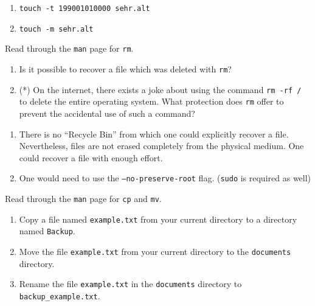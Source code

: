 \documentclass[english]{sheet}
\begin{document}
\begin{solution}
    \begin{enumerate}
        \item \texttt{touch -t 199001010000 sehr.alt}
        \item \texttt{touch -m sehr.alt}
    \end{enumerate}
\end{solution}

\begin{exercise}[subtitle=Deletions with \texttt{rm}]
    Read through the \texttt{man} page for \texttt{rm}.
    \begin{enumerate}
        \item Is it possible to recover a file which was deleted with \texttt{rm}?
        \item (*) On the internet, there exists a joke about using the command \texttt{rm -rf /} to delete the entire operating system. What protection does \texttt{rm} offer to prevent the accidental use of such a command?
    \end{enumerate}
\end{exercise}

\begin{solution}
    \begin{enumerate}
        \item There is no ``Recycle Bin'' from which one could explicitly recover a file. Nevertheless, files are not erased completely from the physical medium. One could recover a file with enough effort.
        \item One would need to use the \texttt{--no-preserve-root} flag. (\texttt{sudo} is required as well)
    \end{enumerate}
\end{solution}

\begin{exercise}[subtitle=File manipulation with \texttt{cp} and \texttt{mv}]
    Read through the \texttt{man} page for \texttt{cp} and \texttt{mv}.
    \begin{enumerate}
        \item Copy a file named \texttt{example.txt} from your current directory to a directory named \texttt{Backup}.
        \item Move the file \texttt{example.txt} from your current directory to the \texttt{documents} directory.
        \item Rename the file \texttt{example.txt} in the \texttt{documents} directory to \texttt{backup_example.txt}.
    \end{enumerate}
\end{exercise}
\end{document}
